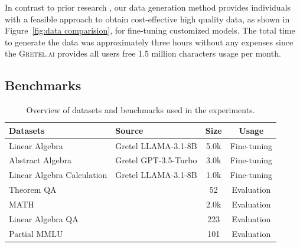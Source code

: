 \documentclass[10pt]{article}
\begin{document}
 
In contrast to prior research \cite{Chen2023AlpaGasusTA, Yue2023MAmmoTHBM, kojima2023largelanguagemodelszeroshot}, our data generation method provides individuals with a feasible approach to obtain cost-effective high quality data, as shown in Figure~\ref{fig:data comparision}, for fine-tuning customized models. The total time to generate the data was approximately three hours without any expenses since the \textsc{Gretel.ai} provides all users free 1.5 million characters usage per month. 

\subsection{Benchmarks}\label{sec:3.2}

\begin{table}[ht]
\centering
\small %
\renewcommand{\arraystretch}{1.3} %
\setlength{\tabcolsep}{8pt} %
\begin{tabularx}{\textwidth}{p{3.5cm} l c c} %
\toprule
\textbf{Datasets} & \textbf{Source} & \textbf{Size} & \textbf{Usage} \\
\midrule
\parbox[t]{3.5cm}{Linear Algebra} & Gretel LLAMA-3.1-8B & 5.0k & Fine-tuning \\
\parbox[t]{3.5cm}{Abstract Algebra} & Gretel GPT-3.5-Turbo & 3.0k & Fine-tuning \\
\parbox[t]{3.5cm}{Linear Algebra Calculation} & Gretel LLAMA-3.1-8B & 1.0k & Fine-tuning \\
\midrule %
\parbox[t]{3.5cm}{Theorem QA} & \cite{Chen2023TheoremQAAT} & 52 & Evaluation \\
\parbox[t]{3.5cm}{MATH} & \cite{hendrycksmath2021} & 2.0k & Evaluation \\
\parbox[t]{3.5cm}{Linear Algebra QA} & \cite{Likhi2003_linearalgebra_QA} & 223 & Evaluation \\
\parbox[t]{3.5cm}{Partial MMLU} & \cite{hendrycks2021ethics} & 101 & Evaluation \\
\bottomrule
\end{tabularx}
\caption{Overview of datasets and benchmarks used in the experiments.}
\label{tab:benchmark}
\end{table}
\end{document}
